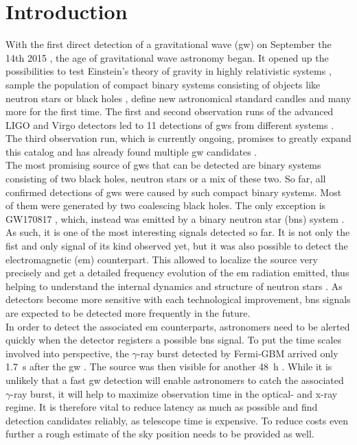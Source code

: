 \section{Introduction}
With the first direct detection of a gravitational wave (\gls{gw}) on September the 14th 2015 \cite{gw150914}, the age of gravitational wave astronomy began. It opened up the possibilities to test Einstein's theory of gravity in highly relativistic systems \cite{test_gr_gw150914}, sample the population of compact binary systems consisting of objects like neutron stars or black holes \cite{population_binary_systems}, define new astronomical standard candles \cite{standard_candles} and many more for the first time. The first and second observation runs of the advanced LIGO and Virgo detectors \cite{aligo, avirgo} led to 11 detections of \gls{gw}s from different systems \cite{catalog}. The third observation run, which is currently ongoing, promises to greatly expand this catalog and has already found multiple \gls{gw} candidates \cite{o3_alerts}.\\
The most promising source of \gls{gw}s that can be detected are binary systems consisting of two black holes, neutron stars or a mix of these two. So far, all confirmed detections of \gls{gw}s were caused by such compact binary systems. Most of them were generated by two coalescing black holes. The only exception is GW170817 \cite{catalog}, which, instead was emitted by a binary neutron star (\gls{bns}) system \cite{gw170817}. As such, it is one of the most interesting signals detected so far. It is not only the fist and only signal of its kind observed yet, but it was also possible to detect the electromagnetic (\gls{em}) counterpart. This allowed to localize the source very precisely and get a detailed frequency evolution of the \gls{em} radiation emitted, thus helping to understand the internal dynamics and structure of neutron stars \cite{multi_messanger}. As detectors become more sensitive with each technological improvement, \gls{bns} signals are expected to be detected more frequently in the future.\\
In order to detect the associated \gls{em} counterparts, astronomers need to be alerted quickly when the detector registers a possible \gls{bns} signal. To put the time scales involved into perspective, the $\gamma$-ray burst detected by Fermi-GBM arrived only \SI{1.7}{\s} after the \gls{gw} \cite{gw170817}. The source was then visible for another \SI{48}{\hour} \cite{multi_messanger}. While it is unlikely that a fast \gls{gw} detection will enable astronomers to catch the associated $\gamma$-ray burst, it will help to maximize observation time in the optical- and x-ray regime. It is therefore vital to reduce latency as much as possible and find detection candidates reliably, as telescope time is expensive. To reduce costs even further a rough estimate of the sky position needs to be provided as well.\\
